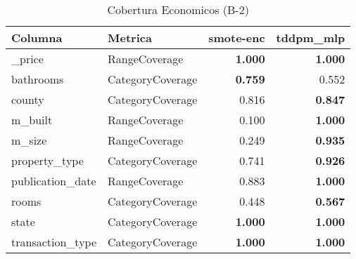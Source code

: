 \begin{table}[H]
\centering
\caption{Cobertura Economicos (B-2)}
\label{table-coverage-economicos-b-2}
\begin{tabular}{|l|l|r|r|}
\hline
\rowcolor[gray]{0.8}
Columna & Metrica & smote-enc & tddpm\_mlp \\
\hline \_price & RangeCoverage & \bfseries 1.000 & \bfseries 1.000 \\
\hline bathrooms & CategoryCoverage & \bfseries 0.759 & 0.552 \\
\hline county & CategoryCoverage & 0.816 & \bfseries 0.847 \\
\hline m\_built & RangeCoverage & 0.100 & \bfseries 1.000 \\
\hline m\_size & RangeCoverage & 0.249 & \bfseries 0.935 \\
\hline property\_type & CategoryCoverage & 0.741 & \bfseries 0.926 \\
\hline publication\_date & RangeCoverage & 0.883 & \bfseries 1.000 \\
\hline rooms & CategoryCoverage & 0.448 & \bfseries 0.567 \\
\hline state & CategoryCoverage & \bfseries 1.000 & \bfseries 1.000 \\
\hline transaction\_type & CategoryCoverage & \bfseries 1.000 & \bfseries 1.000 \\
\hline
\end{tabular}
\end{table}
